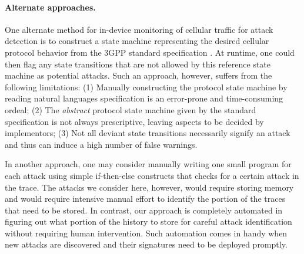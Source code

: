 \paragraph{Alternate approaches.}
One alternate method for in-device monitoring of cellular traffic for
attack detection is to construct a state machine representing the desired
cellular protocol behavior from the 3GPP standard  specification \cite{3gpp, 3gpp12}.
At runtime, one could then flag any state transitions that are not allowed by this
reference state machine as potential attacks.
Such an approach, however, suffers from the following limitations:
(1) Manually constructing the protocol state machine by reading natural languages specification
is an error-prone and time-consuming ordeal;
(2) The \emph{abstract} protocol state machine given by the standard specification is not always prescriptive, leaving
aspects to be decided by implementors;
(3) Not all deviant state transitions necessarily signify an attack
and thus can induce a high number of false warnings.

In another approach, one may consider manually writing one small program
for each attack using simple if-then-else constructs that checks for a certain
attack in the trace. The attacks we consider here, however, would require
storing memory and would require intensive manual effort to identify the portion
of the traces that need to be stored. In contrast, our approach is completely
automated in figuring out what portion of the history to store for careful attack
identification without requiring human intervention. Such automation comes in handy
when new attacks are discovered and their signatures need to be deployed promptly.
